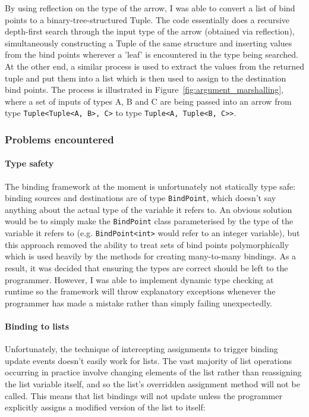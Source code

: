 \documentclass[12pt,twoside,notitlepage]{report}
\begin{document}
By using reflection on the type of the arrow, I was able to convert a list of bind points to a binary-tree-structured Tuple. The code essentially does a recursive depth-first search through the input type of the arrow (obtained via reflection), simultaneously constructing a Tuple of the same structure and inserting values from the bind points wherever a 'leaf' is encountered in the type being searched. At the other end, a similar process is used to extract the values from the returned tuple and put them into a list which is then used to assign to the destination bind points. The process is illustrated in Figure~\ref{fig:argument_marshalling}, where a set of inputs of types A, B and C are being passed into an arrow from type \texttt{Tuple<Tuple<A, B>, C>} to type \texttt{Tuple<A, Tuple<B, C>>}.

\subsubsection{Problems encountered}

\paragraph{Type safety}

The binding framework at the moment is unfortunately not statically type safe: binding sources and destinations are of type \texttt{BindPoint}, which doesn't say anything about the actual type of the variable it refers to. An obvious solution would be to simply make the \texttt{BindPoint} class parameterised by the type of the variable it refers to (e.g. \texttt{BindPoint<int>} would refer to an integer variable), but this approach removed the ability to treat sets of bind points polymorphically which is used heavily by the methods for creating many-to-many bindings. As a result, it was decided that ensuring the types are correct should be left to the programmer. However, I was able to implement dynamic type checking at runtime so the framework will throw explanatory exceptions whenever the programmer has made a mistake rather than simply failing unexpectedly.

\paragraph{Binding to lists}

Unfortunately, the technique of intercepting assignments to trigger binding update events doesn't easily work for lists. The vast majority of list operations occurring in practice involve changing elements of the list rather than reassigning the list variable itself, and so the list's overridden assignment method will not be called. This means that list bindings will not update unless the programmer explicitly assigns a modified version of the list to itself:
\end{document}
